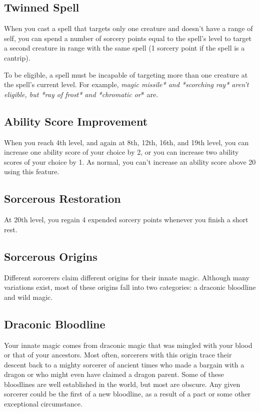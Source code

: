 \subsection{Twinned Spell}

When you cast a spell that targets only one creature and doesn't have a range of self, you can spend a number of sorcery points equal to the spell's level to target a second creature in range with the same spell (1 sorcery point if the spell is a cantrip).

To be eligible, a spell must be incapable of targeting more than one creature at the spell's current level. For example, \textit{magic missile* and *scorching ray* aren't eligible, but *ray of frost* and *chromatic or}* are.

\subsection{Ability Score Improvement}

When you reach 4th level, and again at 8th, 12th, 16th, and 19th level, you can increase one ability score of your choice by 2, or you can increase two ability scores of your choice by 1. As normal, you can't increase an ability score above 20 using this feature.

\subsection{Sorcerous Restoration}

At 20th level, you regain 4 expended sorcery points whenever you finish a short rest.

\subsection{Sorcerous Origins}

Different sorcerers claim different origins for their innate magic. Although many variations exist, most of these origins fall into two categories: a draconic bloodline and wild magic.

\subsection{Draconic Bloodline}

Your innate magic comes from draconic magic that was mingled with your blood or that of your ancestors. Most often, sorcerers with this origin trace their descent back to a mighty sorcerer of ancient times who made a bargain with a dragon or who might even have claimed a dragon parent. Some of these bloodlines are well established in the world, but most are obscure. Any given sorcerer could be the first of a new bloodline, as a result of a pact or some other exceptional circumstance.

